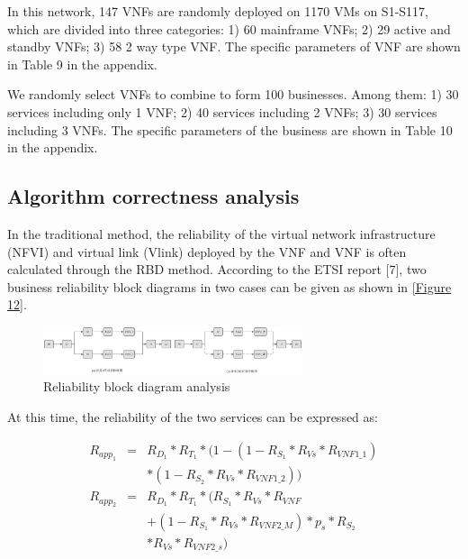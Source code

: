 \documentclass[journal]{IEEEtran}
\begin{document}
    In this network, 147 VNFs are randomly deployed on 1170 VMs on S1-S117, which are divided into three categories: 1) 60 mainframe VNFs; 2) 29 active and standby VNFs; 3) 58 2 way type VNF. The specific parameters of VNF are shown in Table 9 in the appendix.


    We randomly select VNFs to combine to form 100 businesses. Among them: 1) 30 services including only 1 VNF; 2) 40 services including 2 VNFs; 3) 30 services including 3 VNFs. The specific parameters of the business are shown in Table 10 in the appendix.

    \subsection{Algorithm correctness analysis}
    In the traditional method, the reliability of the virtual network infrastructure (NFVI) and virtual link (Vlink) deployed by the VNF and VNF is often calculated through the RBD method. According to the ETSI report [7], two business reliability block diagrams in two cases can be given as shown in \ref{Figure 12}.

    \begin{figure}[!t]
        \begin{center}
            \includegraphics[width = 3in]{img/12.eps}
            \caption{Reliability block diagram analysis}
            \label{fig10}
        \end{center}
    \end{figure}

    At this time, the reliability of the two services can be expressed as:

    \begin{eqnarray}
        R_{app_1}&=& R_{D_1}* R_{T_1} * (1-(1-R_{S_1}*R_{Vs}*R_{VNF1\_1}) \nonumber\\
        &    & *(1-R_{S_2}*R_{Vs}*R_{VNF1\_2}))\\
        R_{app_2}&=& R_{D_1} * R_{T_1} * (R_{S_1}*R_{Vs}*R_{VNF} \nonumber\\
        & & +(1-R_{S_1}*R_{Vs}*R_{VNF2\_M})*p_s*R_{S_2} \nonumber\\
        & &*R_{Vs}*R_{VNF2\_s} )
    \end{eqnarray}
\end{document}
